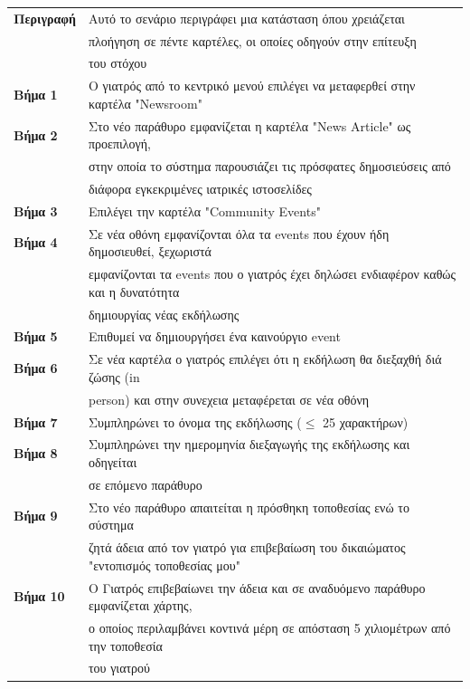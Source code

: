 \documentclass{article}
\newcommand\T{\rule{0pt}{2.6ex}}       %
\newcommand\B{\rule[-1.2ex]{0pt}{0pt}}
\begin{document}
 \begin{center}
     \begin{tabular}{|l|l|}
     \hline
      \textbf{Περιγραφή} & Αυτό το σενάριο περιγράφει μια κατάσταση όπου χρειάζεται \T \\& πλοήγηση σε πέντε καρτέλες, οι οποίες οδηγούν στην επίτευξη \\& του στόχου \B \\ 
      \hline
      \textbf{Βήμα 1} & Ο γιατρός από το κεντρικό μενού επιλέγει να μεταφερθεί στην καρτέλα "Newsroom" \T\B \\
      \hline
      \textbf{Βήμα 2} & Στο νέο παράθυρο εμφανίζεται η καρτέλα "News Article" ως προεπιλογή, \T \\& στην οποία το σύστημα παρουσιάζει τις πρόσφατες δημοσιεύσεις από \\& διάφορα εγκεκριμένες ιατρικές ιστοσελίδες \B \\
      \hline
      \textbf{Βήμα 3} & Επιλέγει την καρτέλα "Community Events" \T\B \\
      \hline
      \textbf{Βήμα 4} & Σε νέα οθόνη εμφανίζονται όλα τα events που έχουν ήδη δημοσιευθεί, ξεχωριστά\T \\ & εμφανίζονται τα events που ο γιατρός έχει δηλώσει ενδιαφέρον καθώς  και η δυνατότητα \\& δημιουργίας νέας εκδήλωσης\B \\
      \hline
      \textbf{Βήμα 5} & Επιθυμεί να δημιουργήσει ένα καινούργιο event \T\B \\
      \hline
      \textbf{Βήμα 6} & Σε νέα καρτέλα ο γιατρός επιλέγει ότι η εκδήλωση θα διεξαχθή διά ζώσης (in \T \\& person) και στην συνεχεια μεταφέρεται σε νέα οθόνη \B\\
      \hline
      \textbf{Βήμα 7} & Συμπληρώνει το όνομα της εκδήλωσης ($\le$ 25 χαρακτήρων) \T\B \\
      \hline
      \textbf{Βήμα 8} & Συμπληρώνει την ημερομηνία διεξαγωγής της εκδήλωσης και οδηγείται \T \\& σε επόμενο παράθυρο \B \\
      \hline
      \textbf{Βήμα 9} & Στο νέο παράθυρο απαιτείται η πρόσθηκη τοποθεσίας ενώ το σύστημα \T \\& ζητά άδεια από τον γιατρό για επιβεβαίωση του δικαιώματος "εντοπισμός τοποθεσίας μου" \B \\
      \hline
       \textbf{Βήμα 10} & Ο Γιατρός επιβεβαίωνει την άδεια και σε αναδυόμενο παράθυρο εμφανίζεται χάρτης, \T \\& ο οποίος περιλαμβάνει κοντινά μέρη σε απόσταση 5 χιλιομέτρων από την τοποθεσία \\& του γιατρού \B \\

\end{tabular}
\end{center}
\end{document}
